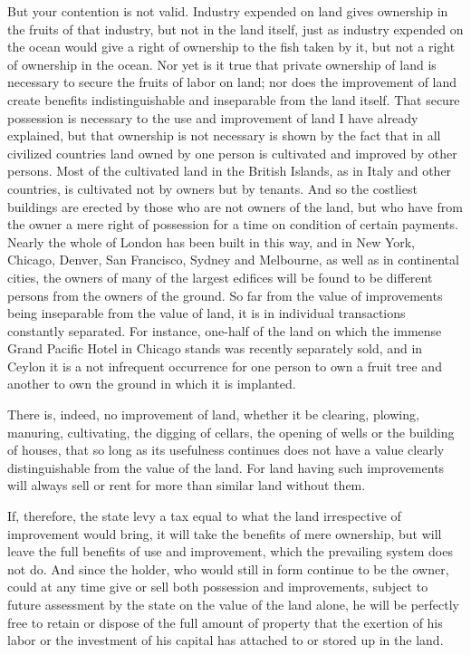 \documentclass{book}
\begin{document}
But your contention is not valid. Industry expended on land gives ownership in the fruits of that industry, but not in the land itself, just as industry expended on the ocean would give a right of ownership to the fish taken by it, but not a right of ownership in the ocean. Nor yet is it true that private ownership of land is necessary to secure the fruits of labor on land; nor does the improvement of land create benefits indistinguishable and inseparable from the land itself. That secure possession is necessary to the use and improvement of land I have already explained, but that ownership is not necessary is shown by the fact that in all civilized countries land owned by one person is cultivated and improved by other persons. Most of the cultivated land in the British Islands, as in Italy and other countries, is cultivated not by owners but by tenants. And so the costliest buildings are erected by those who are not owners of the land, but who have from the owner a mere right of possession for a time on condition of certain payments. Nearly the whole of London has been built in this way, and in New York, Chicago, Denver, San Francisco, Sydney and Melbourne, as well as in continental cities, the owners of many of the largest edifices will be found to be different persons from the owners of the ground. So far from the value of improvements being inseparable from the value of land, it is in individual transactions constantly separated. For instance, one-half of the land on which the immense Grand Pacific Hotel in Chicago stands was recently separately sold, and in Ceylon it is a not infrequent occurrence for one person to own a fruit tree and another to own the ground in which it is implanted.

There is, indeed, no improvement of land, whether it be clearing, plowing, manuring, cultivating, the digging of cellars, the opening of wells or the building of houses, that so long as its usefulness continues does not have a value clearly distinguishable from the value of the land. For land having such improvements will always sell or rent for more than similar land without them.

If, therefore, the state levy a tax equal to what the land irrespective of improvement would bring, it will take the benefits of mere ownership, but will leave the full benefits of use and improvement, which the prevailing system does not do. And since the holder, who would still in form continue to be the owner, could at any time give or sell both possession and improvements, subject to future assessment by the state on the value of the land alone, he will be perfectly free to retain or dispose of the full amount of property that the exertion of his labor or the investment of his capital has attached to or stored up in the land.
\end{document}

